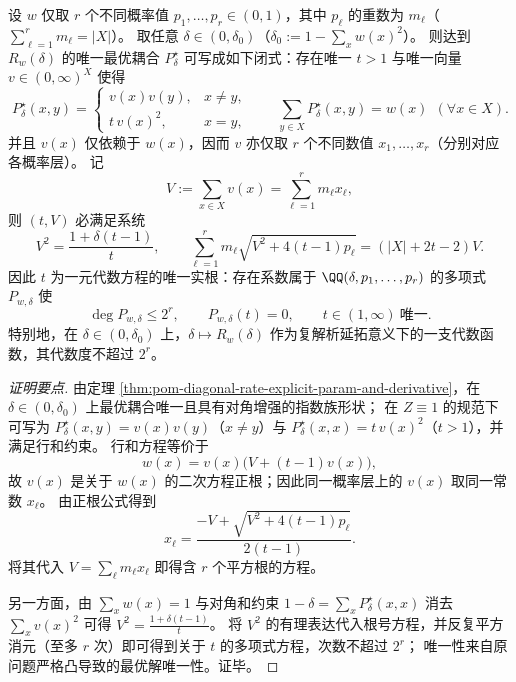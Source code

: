 \begin{theorem}\label{thm:pom-diagonal-rate-finite-layer-algebraic}
设 \(w\) 仅取 \(r\) 个不同概率值 \(p_1,\dots,p_r\in(0,1)\)，其中 \(p_\ell\) 的重数为 \(m_\ell\)（\(\sum_{\ell=1}^r m_\ell=|X|\)）。
取任意 \(\delta\in(0,\delta_0)\)（\(\delta_0:=1-\sum_x w(x)^2\)）。
则达到 \(R_w(\delta)\) 的唯一最优耦合 \(P^\star_\delta\) 可写成如下闭式：存在唯一 \(t>1\) 与唯一向量 \(v\in(0,\infty)^X\) 使得
\[
\boxed{\;
P^\star_\delta(x,y)=
\begin{cases}
v(x)v(y), & x\ne y,\\[2mm]
t\,v(x)^2, & x=y,
\end{cases}
\qquad
\sum_{y\in X}P^\star_\delta(x,y)=w(x)\ \ (\forall x\in X).\;}
\]
并且 \(v(x)\) 仅依赖于 \(w(x)\)，因而 \(v\) 亦仅取 \(r\) 个不同数值 \(x_1,\dots,x_r\)（分别对应各概率层）。
记
\[
V:=\sum_{x\in X}v(x)=\sum_{\ell=1}^r m_\ell x_\ell,
\]
则 \((t,V)\) 必满足系统
\[
\boxed{\;
V^2=\frac{1+\delta(t-1)}{t},\qquad
\sum_{\ell=1}^r m_\ell\sqrt{V^2+4(t-1)p_\ell}=(|X|+2t-2)V.\;}
\]
因此 \(t\) 为一元代数方程的唯一实根：存在系数属于 \(\QQ(\delta,p_1,\dots,p_r)\) 的多项式 \(P_{w,\delta}\) 使
\[
\deg P_{w,\delta}\le 2^r,\qquad P_{w,\delta}(t)=0,\qquad t\in(1,\infty)\ \text{唯一}.
\]
特别地，在 \(\delta\in(0,\delta_0)\) 上，\(\delta\mapsto R_w(\delta)\) 作为复解析延拓意义下的一支代数函数，其代数度不超过 \(2^r\)。
\end{theorem}
\begin{proof}[证明要点]
由定理 \ref{thm:pom-diagonal-rate-explicit-param-and-derivative}，在 \(\delta\in(0,\delta_0)\) 上最优耦合唯一且具有对角增强的指数族形状；
在 \(Z\equiv 1\) 的规范下可写为 \(P^\star_\delta(x,y)=v(x)v(y)\)（\(x\ne y\)）与 \(P^\star_\delta(x,x)=t\,v(x)^2\)（\(t>1\)），并满足行和约束。
行和方程等价于
\[
w(x)=v(x)\bigl(V+(t-1)v(x)\bigr),
\]
故 \(v(x)\) 是关于 \(w(x)\) 的二次方程正根；因此同一概率层上的 \(v(x)\) 取同一常数 \(x_\ell\)。
由正根公式得到
\[
x_\ell=\frac{-V+\sqrt{V^2+4(t-1)p_\ell}}{2(t-1)}.
\]
将其代入 \(V=\sum_\ell m_\ell x_\ell\) 即得含 \(r\) 个平方根的方程。
\par
另一方面，由 \(\sum_x w(x)=1\) 与对角和约束 \(1-\delta=\sum_x P^\star_\delta(x,x)\) 消去 \(\sum_x v(x)^2\) 可得
\(
V^2=\frac{1+\delta(t-1)}{t}
\)。
将 \(V^2\) 的有理表达代入根号方程，并反复平方消元（至多 \(r\) 次）即可得到关于 \(t\) 的多项式方程，次数不超过 \(2^r\)；
唯一性来自原问题严格凸导致的最优解唯一性。证毕。
\end{proof}

